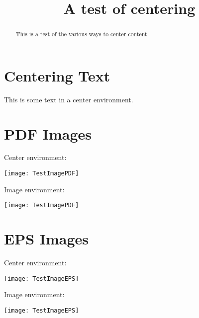 \documentclass{ximera}
\title{A test of centering}
\begin{document}
\begin{abstract}
This is a test of the various ways to center content.
\end{abstract}
\maketitle

\section{Centering Text}

\begin{center}
This is some text in a center environment.
\end{center}



\section{PDF Images}

Center environment: 

\begin{center}
\texttt{[image: TestImagePDF]}
\end{center}

Image environment:

\begin{image}
\texttt{[image: TestImagePDF]}
\end{image}



\section{EPS Images}

Center environment:

\begin{center}
\texttt{[image: TestImageEPS]}
\end{center}

Image environment:

\begin{image}
\texttt{[image: TestImageEPS]}
\end{image}
\end{document}
